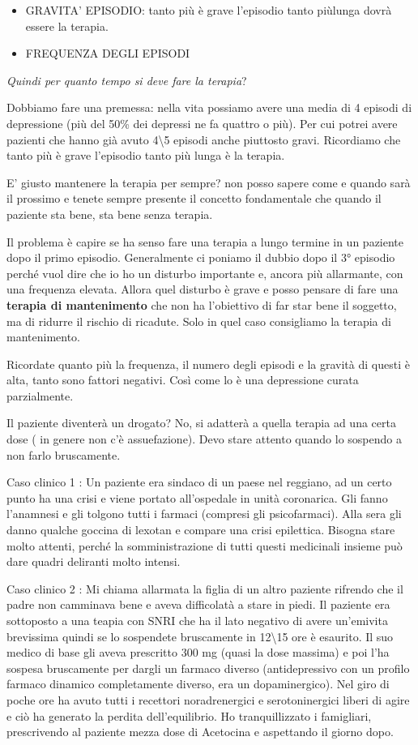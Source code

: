 \documentclass[]{article}
\begin{document}
\begin{itemize}
\item
  GRAVITA' EPISODIO: tanto più è grave l'episodio tanto piùlunga dovrà
  essere la terapia.
\item
  FREQUENZA DEGLI EPISODI
\end{itemize}

\emph{Quindi per quanto tempo si deve fare la terapia}?

Dobbiamo fare una premessa: nella vita possiamo avere una media di 4
episodi di depressione (più del 50\% dei depressi ne fa quattro o più).
Per cui potrei avere pazienti che hanno già avuto 4\textbackslash{}5
episodi anche piuttosto gravi. Ricordiamo che tanto più è grave
l'episodio tanto più lunga è la terapia.

E' giusto mantenere la terapia per sempre? non posso sapere come e
quando sarà il prossimo e tenete sempre presente il concetto
fondamentale che quando il paziente sta bene, sta bene senza terapia.

Il problema è capire se ha senso fare una terapia a lungo termine in un
paziente dopo il primo episodio. Generalmente ci poniamo il dubbio dopo
il 3° episodio perché vuol dire che io ho un disturbo importante e,
ancora più allarmante, con una frequenza elevata. Allora quel disturbo è
grave e posso pensare di fare una \textbf{terapia di mantenimento} che
non ha l'obiettivo di far star bene il soggetto, ma di ridurre il
rischio di ricadute. Solo in quel caso consigliamo la terapia di
mantenimento.

Ricordate quanto più la frequenza, il numero degli episodi e la gravità
di questi è alta, tanto sono fattori negativi. Così come lo è una
depressione curata parzialmente.

Il paziente diventerà un drogato? No, si adatterà a quella terapia ad
una certa dose ( in genere non c'è assuefazione). Devo stare attento
quando lo sospendo a non farlo bruscamente.

Caso clinico 1 : Un paziente era sindaco di un paese nel reggiano, ad un
certo punto ha una crisi e viene portato all'ospedale in unità
coronarica. Gli fanno l'anamnesi e gli tolgono tutti i farmaci (compresi
gli psicofarmaci). Alla sera gli danno qualche goccina di lexotan e
compare una crisi epilettica. Bisogna stare molto attenti, perché la
somministrazione di tutti questi medicinali insieme può dare quadri
deliranti molto intensi.

Caso clinico 2 : Mi chiama allarmata la figlia di un altro paziente
rifrendo che il padre non camminava bene e aveva difficolatà a stare in
piedi. Il paziente era sottoposto a una teapia con SNRI che ha il lato
negativo di avere un'emivita brevissima quindi se lo sospendete
bruscamente in 12\textbackslash{}15 ore è esaurito. Il suo medico di
base gli aveva prescritto 300 mg (quasi la dose massima) e poi l'ha
sospesa bruscamente per dargli un farmaco diverso (antidepressivo con un
profilo farmaco dinamico completamente diverso, era un dopaminergico).
Nel giro di poche ore ha avuto tutti i recettori noradrenergici e
serotoninergici liberi di agire e ciò ha generato la perdita
dell'equilibrio. Ho tranquillizzato i famigliari, prescrivendo al
paziente mezza dose di Acetocina e aspettando il giorno dopo.
\end{document}
